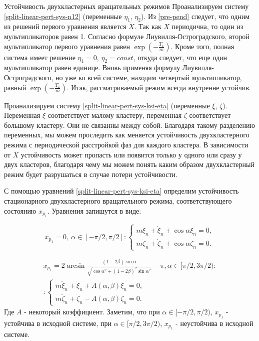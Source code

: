 \begin{chapter}{Устойчивость двухкластерных вращательных режимов}
	Проанализируем систему \ref{split-linear-pert-sys-n12} (переменные $\eta_1$, $\eta_2$).
	Из \ref{pre-pend} следует, что одним из
	решений первого уравнения является $\dot{X}$.
	Так как $X$ периодична, то один из мультипликаторов равен 1.
	Согласно формуле Лиувилля-Остроградского, второй мультипликатор первого уравнения равен $\exp{(-\frac{T_x}{m})}$.
	Кроме того, полная система имеет решение $\eta_1 = 0$, $\eta_2 = const$,
	откуда следует, что еще один мультипликатор равен единице.
	Вновь применяя формулу Лиувилля-Остроградского, но
	уже ко всей системе, находим четвертый мультипликатор,
	равный $\exp{(-\frac{T_x}{m})}$. 
	Итак, рассматриваемый режим всегда внутренне устойчив.

	
	Проанализируем систему \ref{split-linear-pert-sys-ksi-eta} (переменные $\xi$, $\zeta$).
	Переменная $\xi$ соответствует малому кластеру, переменная $\zeta$ соответствует большому кластеру. 
	Они не связанны между собой.
	Благодаря такому разделению переменных, мы можем проследить как меняется устойчивость
	двухкластерного режима с периодической расстройкой фаз для каждого кластера. В зависимости от $X$ устойчивость
	может пропасть или появится только у одного или сразу у двух кластеров, благодаря чему мы можем
	понять каким образом двухкластерный режим будет разрушаться в случае потери устойчивости.
	
	С помощью уравнений \ref{split-linear-pert-sys-ksi-eta} определим устойчивость стационарного
	двухкластерного вращательного режима, соответствующего состоянию $x_{p_1}$.
	Уравнения запишутся в виде:
	
	\begin{equation}
		x_{p_1} = 0, \ \alpha \in [-\pi/ 2, \pi/2]: 
		\begin{cases}
			m\ddot{\xi}_n + \dot{\xi}_n + \cos{\alpha}\xi_n = 0, \\
			m\ddot{\zeta}_n + \dot{\zeta}_n + \cos{\alpha}\zeta_n = 0.
		\end{cases}
	\end{equation}
	
	\begin{equation}
		\begin{split}
			x_{p_1} = 2\arcsin{\frac{(1 - 2\beta) \sin{\alpha}}{\sqrt{\cos{\alpha}^2 + (1 - 2\beta)^2\sin{\alpha}^2}}} - \pi , \alpha \in [\pi/2, 3\pi/2): \\ 
			:\begin{cases}
				m\ddot{\xi}_n + \dot{\xi}_n + A(\alpha, \beta) \xi_n = 0, \\
				m\ddot{\zeta}_n + \dot{\zeta}_n -A(\alpha, \beta) \zeta_n = 0.
			\end{cases}
		\end{split}
	\end{equation}
	Где $A$ - некоторый коэффициент. Заметим, что при $\alpha \in [-\pi/ 2, \pi/2)$, $x_{p_1}$ - устойчива в исходной системе,
	при $\alpha \in [\pi/2, 3\pi/2)$, $x_{p_1}$ - неустойчива в исходной системе.


\end{chapter}
